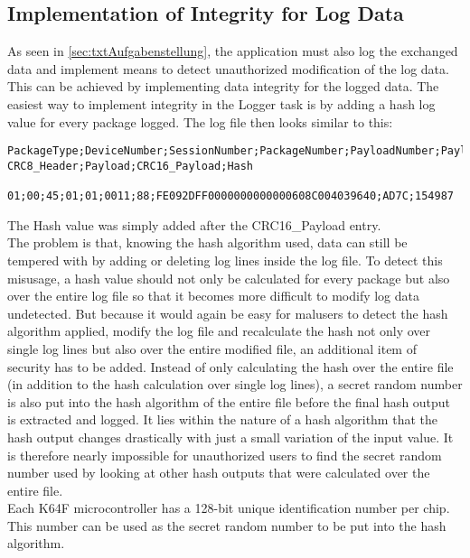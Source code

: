 \subsection{Implementation of Integrity for Log Data}
As seen in \autoref{sec:txtAufgabenstellung}, the application must also log the exchanged data and implement means to detect unauthorized modification of the log data. This can be achieved by implementing data integrity for the logged data.
The easiest way to implement integrity in the Logger task is by adding a hash log value for every package logged. The log file then looks similar to this:\\
\begin{lstlisting}
PackageType;DeviceNumber;SessionNumber;PackageNumber;PayloadNumber;PayloadSize;
CRC8_Header;Payload;CRC16_Payload;Hash

01;00;45;01;01;0011;88;FE092DFF0000000000000608C004039640;AD7C;154987
\end{lstlisting}
The Hash value was simply added after the CRC16\_Payload entry.\\
The problem is that, knowing the hash algorithm used, data can still be tempered with by adding or deleting log lines inside the log file. To detect this misusage, a hash value should not only be calculated for every package but also over the entire log file so that it becomes more difficult to modify log data undetected. But because it would again be easy for malusers to detect the hash algorithm applied, modify the log file and recalculate the hash not only over single log lines but also over the entire modified file, an additional item of security has to be added. Instead of only calculating the hash over the entire file (in addition to the hash calculation over single log lines), a secret random number is also put into the hash algorithm of the entire file before the final hash output is extracted and logged. It lies within the nature of a hash algorithm that the hash output changes drastically with just a small variation of the input value. It is therefore nearly impossible for unauthorized users to find the secret random number used by looking at other hash outputs that were calculated over the entire file.\\
Each K64F microcontroller has a 128-bit unique identification number per chip. This number can be used as the secret random number to be put into the hash algorithm.\\
